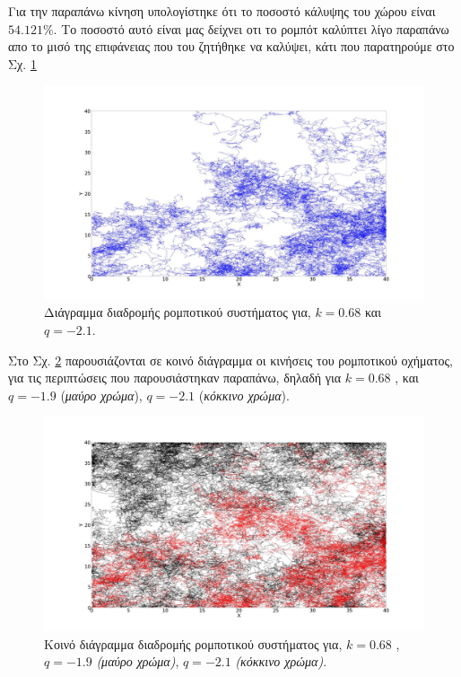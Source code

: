 Για την παραπάνω κίνηση υπολογίστηκε ότι το ποσοστό κάλυψης του χώρου είναι
$54.121 \% $. Το ποσοστό αυτό είναι μας δείχνει οτι το ρομπότ καλύπτει λίγο παραπάνω απο το μισό της επιφάνειας που του ζητήθηκε να καλύψει, κάτι που παρατηρούμε στο Σχ. \ref{f:g76}

\begin{figure}[ht]
	\centering
	\includegraphics[width=1\linewidth]{LateX images/log/q/g2-2.1}
	\caption{Διάγραμμα διαδρομής ρομποτικού συστήματος για, $k = 0.68$ και $q = -2.1$.}
	\label{f:g76}	
\end{figure}


Στο Σχ. \ref{f:g77} παρουσιάζονται σε κοινό διάγραμμα οι κινήσεις του ρομποτικού οχήματος, για τις
περιπτώσεις που παρουσιάστηκαν παραπάνω, δηλαδή για $k=0.68$ , και $q = -1.9$ (\emph{μαύρο χρώμα}), $q = -2.1$  (\emph{κόκκινο χρώμα}).

\begin{figure}[ht]
	\centering
	\includegraphics[width=1\linewidth]{LateX images/log/q/g2}
	\caption{Κοινό διάγραμμα διαδρομής ρομποτικού συστήματος για, $k = 0.68$ , $q = -1.9$ \emph{(μαύρο χρώμα)}, $q = -2.1$  \emph{(κόκκινο χρώμα)}.}
	\label{f:g77}	
\end{figure}

